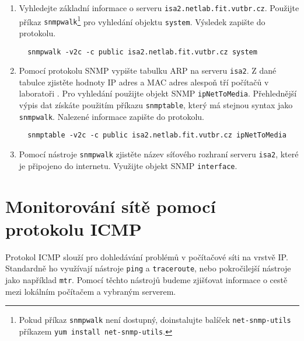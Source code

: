 \documentclass[a4paper,11pt]{article}
\begin{document}
\begin{enumerate}
\item Vyhledejte základní informace o serveru {\tt isa2.netlab.fit.vutbr.cz}.  Použijte příkaz {\tt snmpwalk}\footnote{Pokud příkaz {\tt snmpwalk} není dostupný, doinstalujte balíček \texttt{net-snmp-utils} příkazem \texttt{yum install net-snmp-utils}.} pro vyhledání objektu \texttt{system}. %
  Výsledek zapište do protokolu. 
\begin{verbatim}
  snmpwalk -v2c -c public isa2.netlab.fit.vutbr.cz system
\end{verbatim}
  \item Pomocí protokolu SNMP vypište tabulku ARP na serveru {\tt isa2}. Z dané tabulce zjistěte  hodnoty IP adres a MAC adres alespoň tří počítačů v laboratoři . Pro vyhledání použijte objekt SNMP \texttt{ipNetToMedia}. Přehlednější výpis dat získáte použitím příkazu \texttt{snmptable}, který má stejnou syntax jako \texttt{snmpwalk}. Nalezené informace zapište do protokolu. 
\begin{verbatim}
  snmptable -v2c -c public isa2.netlab.fit.vutbr.cz ipNetToMedia
\end{verbatim}
\item Pomocí nástroje {\tt snmpwalk} zjistěte název síťového rozhraní serveru {\tt isa2}, které je připojeno do internetu. 
  Využijte objekt SNMP \texttt{interface}.
\end{enumerate}

\section{Monitorování sítě pomocí protokolu ICMP}
Protokol ICMP slouží pro dohledávání problémů v počítačové síti na vrstvě IP. Standardně ho využívají nástroje \texttt{ping} a \texttt{traceroute}, nebo pokročilejší nástroje jako například \texttt{mtr}. Pomocí těchto nástrojů budeme zjišťovat informace o cestě mezi lokálním počítačem a vybraným serverem.
\end{document}
